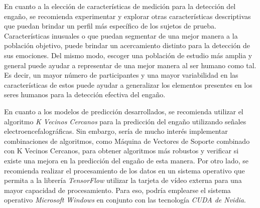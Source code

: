 En cuanto a la elección de características de medición para la detección del engaño, se recomienda experimentar y explorar otras características descriptivas que puedan brindar un perfil más específico de los sujetos de prueba. Características inusuales o que puedan segmentar de una mejor manera a la población objetivo, puede brindar un acercamiento distinto para la detección de sus emociones. Del mismo modo, escoger una población de estudio más amplia y general puede ayudar a representar de una mejor manera al ser humano como tal. Es decir, un mayor número de participantes y una mayor variabilidad en las características de estos puede ayudar a generalizar los elementos presentes en los seres humanos para la detección efectiva del engaño.

En cuanto a los modelos de predicción desarrollados, se recomienda utilizar el algoritmo \textit{K Vecinos Cercanos} para la predicción del engaño utilizando señales electroencefalográficas. Sin embargo, sería de mucho interés implementar combinaciones de algoritmos, como Máquina de Vectores de Soporte combinado con K Vecinos Cercanos, para obtener algoritmos más robustos y verificar si existe una mejora en la predicción del engaño de esta manera. Por otro lado, se recomienda realizar el procesamiento de los datos en un sistema operativo que permita a la librería \textit{TensorFlow} utilizar la tarjeta de vídeo externa para una mayor capacidad de procesamiento. Para eso, podría emplearse el sistema operativo \textit{Microsoft Windows} en conjunto con las tecnología \textit{CUDA de Nvidia}. 